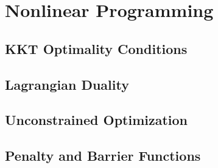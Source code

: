 \part{Nonlinear Programming}
	\chapter{KKT Optimality Conditions}

	\chapter{Lagrangian Duality}

	\chapter{Unconstrained Optimization}

	\chapter{Penalty and Barrier Functions}